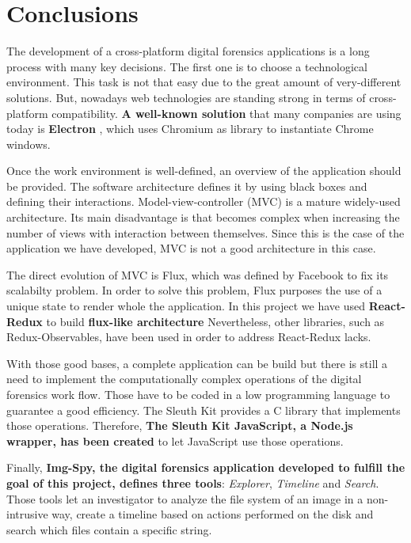 \cleardoublepage
{}
\chapter*{Conclusions}

The development of a cross-platform digital forensics applications is a long
process with many key decisions. The first one is to choose a technological
environment. This task is not that easy due to the great amount of
very-different solutions. But, nowadays web technologies are standing strong in
terms of cross-platform compatibility. \textbf{A well-known solution} that many
companies are using today is \textbf{Electron} \cite{electron-web}, which uses
Chromium as library to instantiate Chrome windows. 

Once the work environment is well-defined, an overview of the application 
should be provided. The software architecture defines it by using black boxes
and defining their interactions. Model-view-controller (MVC) is a mature
widely-used architecture. Its main disadvantage is that becomes complex when
increasing the number of views with interaction between themselves. Since
this is the case of the application we have developed, MVC is not a good
architecture in this case.

The direct evolution of MVC is Flux, which was defined by Facebook to fix its
scalabilty problem. In order to solve this problem, Flux purposes the use of
a unique state to render whole the application. In this project we have
used \textbf{React-Redux} to build  \textbf{flux-like architecture}
Nevertheless, other libraries, such as Redux-Observables, have been used in
order to address React-Redux lacks.

With those good bases, a complete application can be build but there is still a
need to implement the computationally complex operations of the digital 
forensics work flow. Those have to be coded in a low programming language to
guarantee a good efficiency. The Sleuth Kit provides a C library that
implements those operations. Therefore, \textbf{The Sleuth Kit JavaScript, a
Node.js wrapper, has been created} to let JavaScript use those operations.

Finally, \textbf{Img-Spy, the digital forensics application developed to fulfill
the goal of this project, defines three tools}: \textit{Explorer},
\textit{Timeline} and \textit{Search}. Those tools let an investigator to
analyze the file system of an image in a non-intrusive way, create a timeline
based on actions performed on the disk and search which files contain a
specific string.


